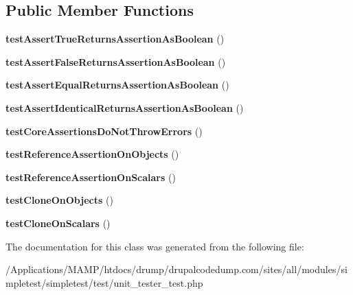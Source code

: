 \subsection*{Public Member Functions}
\begin{DoxyCompactItemize}
\item 
\hypertarget{class_test_of_unit_tester_a3a8098da48c526c58c4756e7d8638eb5}{
{\bfseries testAssertTrueReturnsAssertionAsBoolean} ()}
\label{class_test_of_unit_tester_a3a8098da48c526c58c4756e7d8638eb5}

\item 
\hypertarget{class_test_of_unit_tester_a3cdceb58bb1e767c2e6fb8cceb33eae8}{
{\bfseries testAssertFalseReturnsAssertionAsBoolean} ()}
\label{class_test_of_unit_tester_a3cdceb58bb1e767c2e6fb8cceb33eae8}

\item 
\hypertarget{class_test_of_unit_tester_ab16b18e343de6f5d4e0606864a650f51}{
{\bfseries testAssertEqualReturnsAssertionAsBoolean} ()}
\label{class_test_of_unit_tester_ab16b18e343de6f5d4e0606864a650f51}

\item 
\hypertarget{class_test_of_unit_tester_a0c700159a4c90ae7b88bd750a2dabce7}{
{\bfseries testAssertIdenticalReturnsAssertionAsBoolean} ()}
\label{class_test_of_unit_tester_a0c700159a4c90ae7b88bd750a2dabce7}

\item 
\hypertarget{class_test_of_unit_tester_a890512fc096c939cd4e9611da035c20d}{
{\bfseries testCoreAssertionsDoNotThrowErrors} ()}
\label{class_test_of_unit_tester_a890512fc096c939cd4e9611da035c20d}

\item 
\hypertarget{class_test_of_unit_tester_a536cec81aa3a2f5bc4eaace07c76dd51}{
{\bfseries testReferenceAssertionOnObjects} ()}
\label{class_test_of_unit_tester_a536cec81aa3a2f5bc4eaace07c76dd51}

\item 
\hypertarget{class_test_of_unit_tester_a24bb1176f150344cf1c912bf91c65a78}{
{\bfseries testReferenceAssertionOnScalars} ()}
\label{class_test_of_unit_tester_a24bb1176f150344cf1c912bf91c65a78}

\item 
\hypertarget{class_test_of_unit_tester_a202e5f2d94aeb330df25c26eff1b96fe}{
{\bfseries testCloneOnObjects} ()}
\label{class_test_of_unit_tester_a202e5f2d94aeb330df25c26eff1b96fe}

\item 
\hypertarget{class_test_of_unit_tester_a761d5440b283a6398baa510a3bb4e93a}{
{\bfseries testCloneOnScalars} ()}
\label{class_test_of_unit_tester_a761d5440b283a6398baa510a3bb4e93a}

\end{DoxyCompactItemize}


The documentation for this class was generated from the following file:\begin{DoxyCompactItemize}
\item 
/Applications/MAMP/htdocs/drump/drupalcodedump.com/sites/all/modules/simpletest/simpletest/test/unit\_\-tester\_\-test.php\end{DoxyCompactItemize}
